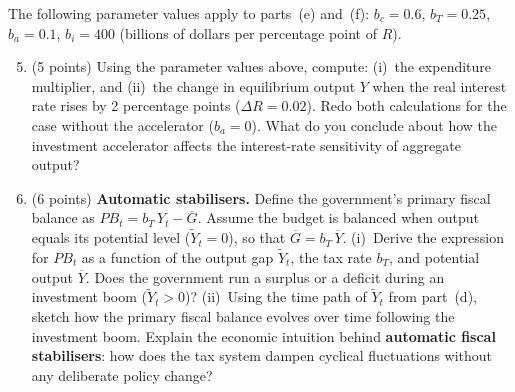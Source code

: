 \documentclass[letterpaper,12pt]{article}
\theoremstyle{dotlessS}
\begin{document}
\noindent The following parameter values apply to parts~(e) and~(f): $b_c = 0.6$,\; $b_T = 0.25$,\; $b_a = 0.1$,\; $b_i = 400$ (billions of dollars per percentage point of $R$).

\begin{enumerate}[label=(\alph*)]
\setcounter{enumi}{4}
\item (5 points) Using the parameter values above, compute: (i)~the expenditure multiplier, and (ii)~the change in equilibrium output $Y$ when the real interest rate rises by 2 percentage points ($\Delta R = 0.02$). Redo both calculations for the case without the accelerator ($b_a = 0$). What do you conclude about how the investment accelerator affects the interest-rate sensitivity of aggregate output?

\item (6 points) \textbf{Automatic stabilisers.} Define the government's primary fiscal balance as $PB_t = b_T\,Y_t - \overline{G}$. Assume the budget is balanced when output equals its potential level ($\widetilde{Y}_t = 0$), so that $\overline{G} = b_T\,\overline{Y}$. (i)~Derive the expression for $PB_t$ as a function of the output gap $\widetilde{Y}_t$, the tax rate $b_T$, and potential output $\overline{Y}$. Does the government run a surplus or a deficit during an investment boom ($\widetilde{Y}_t > 0$)? (ii)~Using the time path of $\widetilde{Y}_t$ from part~(d), sketch how the primary fiscal balance evolves over time following the investment boom. Explain the economic intuition behind \textbf{automatic fiscal stabilisers}: how does the tax system dampen cyclical fluctuations without any deliberate policy change?
\end{enumerate}


\end{document}
